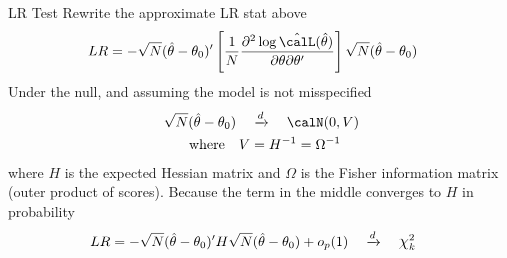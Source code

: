 \documentclass[aspectratio=169, handout]{beamer}
\newcommand*{\Chi}{\mbox{\large$\chi$}} %
\newcommand{\dto}{\xrightarrow{d}}
\begin{document}
\begin{frame}[shrink]{LR Test}
Rewrite the approximate LR stat above
\begin{align*}
  LR
  &=
  -
  \sqrt{N}
  (\hat{\theta}-\theta_0)'
  \left[
  \frac{1}{N}
  \frac{%
    \partial^2\log \hat{\calL}(\hat{\theta})
  }{%
    \partial \theta
    \partial \theta'
  }
  \right]
  \sqrt{N}
  (\hat{\theta}-\theta_0)
\end{align*}
Under the null, and assuming the model is not misspecified
\begin{align*}
  \sqrt{N}(\hat{\theta}-\theta_0)
  \quad&\dto\quad
  \calN(0,V)
  \\
  \qquad\text{where}\quad
  V
  &=
  H^{-1}
  =
  \Omega^{-1}
\end{align*}
where $H$ is the expected Hessian matrix and
$\Omega$ is the Fisher information matrix (outer product of scores).
Because the term in the middle converges to $H$ in probability
\begin{align*}
  LR
  &=
  -
  \sqrt{N}(\hat{\theta}-\theta_0)'
  H
  \sqrt{N}(\hat{\theta}-\theta_0)
  +
  o_p(1)
  \quad\dto\quad
  \Chi^2_k
\end{align*}
\end{frame}


\end{document}
